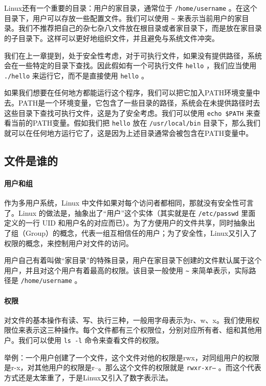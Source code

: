 Linux还有一个重要的目录：用户的家目录，通常位于 \texttt{/home/username} 。在这个目录下，用户可以存放一些配置文件。我们可以使用 \texttt{\textasciitilde} 来表示当前用户的家目录。我们不推荐把自己的杂七杂八文件放在根目录或者家目录下，而是放在家目录的子目录下。这样可以更好地组织文件，并且避免与系统文件冲突。

我们在上一章提到，处于安全性考虑，对于可执行文件，如果没有提供路径，系统会在一些特定的目录下查找。因此假如有一个可执行文件 \texttt{hello} ，我们应当使用 \texttt{./hello} 来运行它，而不是直接使用 \texttt{hello} 。

如果我们想要在任何地方都能运行这个程序，我们可以把它加入PATH环境变量中去。PATH是一个环境变量，它包含了一些目录的路径，系统会在未提供路径时去这些目录下查找可执行文件，这是为了安全考虑。我们可以使用 \texttt{echo \$PATH} 来查看当前的PATH变量。假如我们把 \texttt{hello} 放在 \texttt{/usr/local/bin} 目录下，那么我们就可以在任何地方运行它了，这是因为上述目录通常会被包含在PATH变量中。

\subsection{文件是谁的}

\paragraph{用户和组}

作为多用户系统，Linux 中文件如果对每个访问者都相同，那就没有安全性可言了。Linux 的做法是，抽象出了“用户”这个实体（其实就是在 \texttt{/etc/passwd} 里面定义的一行 UID 和用户名的对应而已）。为了方便用户的文件共享，同时抽象出了组（Group）的概念，代表一组互相信任的用户；为了安全性，Linux又引入了权限的概念，来控制用户对文件的访问。

用户自己有着叫做“家目录”的特殊目录，用户在家目录下创建的文件默认属于这个用户，并且对这个用户有着最高的权限。该目录一般使用 \texttt{\textasciitilde} 来简单表示，实际路径是 \texttt{/home/username} 。

\paragraph{权限}

对文件的基本操作有读、写、执行三种，一般用字母表示为r、w、x。我们使用权限位来表示这三种操作。每个文件都有三个权限位，分别对应所有者、组和其他用户。我们可以使用 \texttt{ls -l} 命令来查看文件的权限。

举例：一个用户创建了一个文件，这个文件对他的权限是rwx，对同组用户的权限是r-x，对其他用户的权限是r--。那么这个文件的权限就是 \texttt{rwxr-xr--} 。而这个代表方式还是太笨重了，于是Linux又引入了数字表示法。

